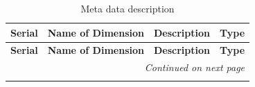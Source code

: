 \begin{center}
	\begin{longtable}{l|l|l|l}
		\caption{Meta data description} \label{metadata}  \\ 
		\hline
		\textbf{Serial} & 
		\textbf{Name of Dimension} & 
		\textbf{Description} & 
		\textbf{Type} \\
		\hline
		\endfirsthead
		
		\hline 
		\multicolumn{1}{c|}{\textbf{Serial}} &
		\multicolumn{1}{|c|}{\textbf{Name of Dimension}} & \multicolumn{1}{c|}{\textbf{ Description}} & \multicolumn{1}{c|}{\textbf{Type}} \\ \hline 
		\endhead
		
		\hline \multicolumn{4}{r}{{\textit{Continued on next page}}} \\ \hline
		\endfoot
		

\end{longtable}
\end{center}
